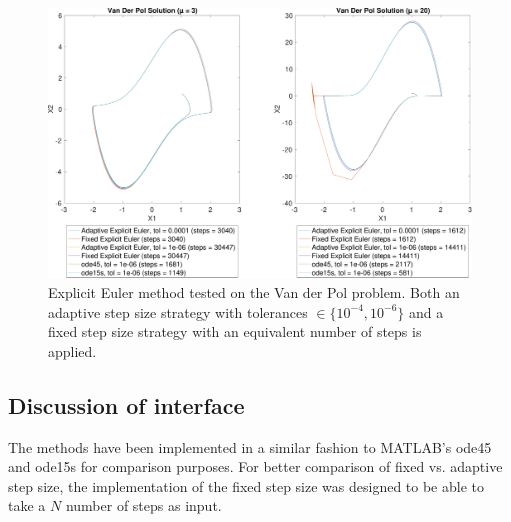 \begin{figure}
    \centering
    \includegraphics[width=\textwidth]{plots/2_4main_04_06.pdf}
    \caption{Explicit Euler method tested on the Van der Pol problem. Both an adaptive step size strategy with tolerances $\in \{10^{-4}, 10^{-6}\}$ and a fixed step size strategy with an equivalent number of steps is applied.}
    \label{fig:2_4b}
\end{figure}

\subsection{Discussion of interface}
The methods have been implemented in a similar fashion to MATLAB's ode45 and ode15s for comparison purposes. For better comparison of fixed vs. adaptive step size, the implementation of the fixed step size was designed to be able to take a $N$ number of steps as input.
